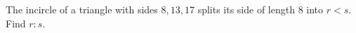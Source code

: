 The incircle of a triangle with sides $8,13,17$ splits its side of length $8$ into $r<s$. Find $r:s$.
